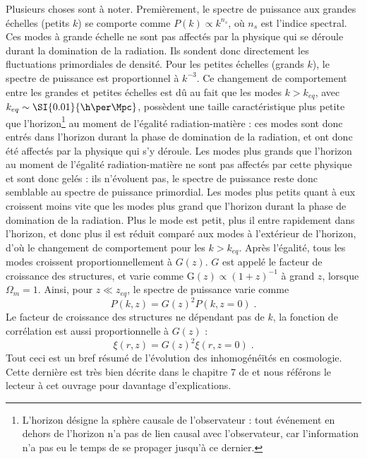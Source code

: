 Plusieurs choses sont à noter. Premièrement, le spectre de puissance aux grandes échelles (petits $k$) se comporte comme $P(k) \propto k^{n_s}$, où $n_s$ est l'indice spectral.
Ces modes à grande échelle ne sont pas affectés par la physique qui se déroule durant la domination de la radiation. Ils sondent donc directement les fluctuations primordiales de densité.
Pour les petites échelles (grands $k$), le spectre de puissance est proportionnel à $k^{-3}$. Ce changement de comportement entre les grandes et petites échelles est dû au fait que les modes $k > k_{eq}$, avec  $k_{eq} \sim \SI{0.01}{\h\per\Mpc}$, possèdent une taille caractéristique plus petite que l'horizon\footnote{L'horizon désigne la sphère causale de l'observateur : tout événement en dehors de l'horizon n'a pas de lien causal avec l'observateur, car l'information n'a pas eu le temps de se propager jusqu'à ce dernier.} au moment de l'égalité radiation-matière : ces modes sont donc entrés dans l'horizon durant la phase de domination de la radiation, et ont donc été affectés par la physique qui s'y déroule.
Les modes plus grands que l'horizon au moment de l'égalité radiation-matière ne sont pas affectés par cette physique et sont donc gelés : ils n'évoluent pas, le spectre de puissance reste donc semblable au spectre de puissance primordial.
Les modes plus petits quant à eux croissent moins vite que les modes plus grand que l'horizon durant la phase de domination de la radiation. Plus le mode est petit, plus il entre rapidement dans l'horizon, et donc plus il est réduit comparé aux modes à l'extérieur de l'horizon, d'où le changement de comportement pour les $k > k_{eq}$. Après l'égalité, tous les modes croissent proportionnellement à $G(z)$. 
$G$ est appelé le facteur de croissance des structures, et varie comme $\mathrm{G}(z) \propto (1+z)^{-1}$ à grand $z$, lorsque $\Omega_m = 1$. Ainsi, pour $z \ll z_{eq}$, le spectre de puissance varie comme
\begin{equation}
  \label{eq:pow_spec_vs_z}
  P(k,z) = G(z)^{2} P(k,z=0)  \; .
\end{equation}
Le facteur de croissance des structures ne dépendant pas de $k$, la fonction de corrélation est aussi proportionnelle à $G(z)$ :
\begin{equation}
  \label{eq:cf_vs_z}
  \xi(r, z) = G(z)^{2} \xi(r, z=0) \; .
\end{equation}
Tout ceci est un bref résumé de l'évolution des inhomogénéïtés en cosmologie. Cette dernière est très bien décrite dans le chapitre 7 de \textcite{Dodelson2003} et nous référons le lecteur à cet ouvrage pour davantage d'explications.


